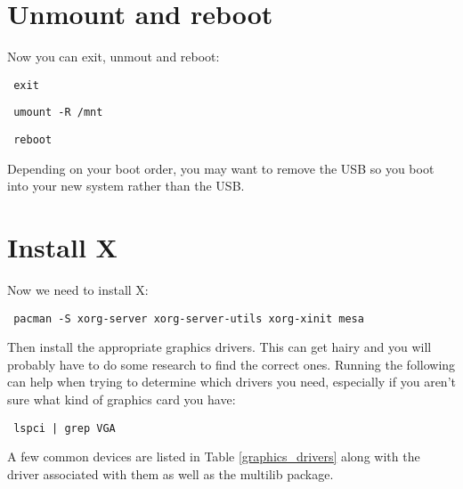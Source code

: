 \documentclass[12pt]{article}
\begin{document}
\section*{Unmount and reboot}
    Now you can exit, unmout and reboot:
    \begin{verbatim} exit \end{verbatim}
    \begin{verbatim} umount -R /mnt \end{verbatim}
    \begin{verbatim} reboot \end{verbatim}
    Depending on your boot order, you may want to remove the USB so you boot
    into your new system rather than the USB.

\section*{Install X}
    Now we need to install X:
    \begin{verbatim} pacman -S xorg-server xorg-server-utils xorg-xinit mesa \end{verbatim}
    Then install the appropriate graphics drivers. This can get hairy and you
    will probably have to do some research to find the correct ones. Running
    the following can help when trying to determine which drivers you need,
    especially if you aren't sure what kind of graphics card you have:
    \begin{verbatim} lspci | grep VGA \end{verbatim}
    A few common devices are listed in Table \ref{graphics_drivers} along with
    the driver associated with them as well as the multilib package.
\end{document}

